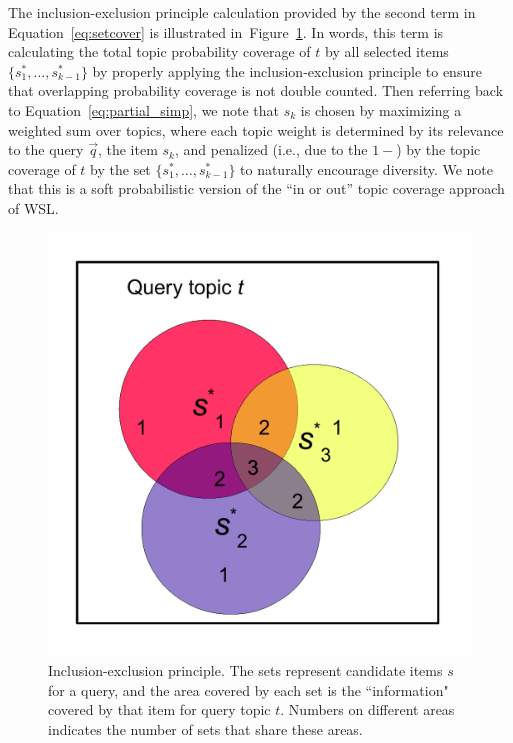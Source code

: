 The inclusion-exclusion principle calculation provided by the second term in Equation~\ref{eq:setcover}
is illustrated in~Figure~\ref{fig:inclusionExclusionPrinciple}. In words, this term is calculating the total topic probability coverage of $t$ by all
selected items $\{ s_1^*,\ldots,s_{k-1}^* \}$ by properly applying the
inclusion-exclusion principle to ensure that overlapping probability coverage
is not double counted. Then referring back to Equation~\ref{eq:partial_simp}, we note that $s_k$ is chosen by maximizing a weighted
sum over topics, where each topic weight is determined by its relevance
to the query $\vec{q}$, the item $s_k$, and penalized (i.e., due to the $1 - $)
by the topic coverage of $t$ by the set $\{ s_1^*,\ldots,s_{k-1}^* \}$ to
naturally encourage diversity.  We note that this is a soft probabilistic
version of the ``in or out'' topic coverage approach of WSL.

\begin{figure}[t!]
\begin{center}
\centerline{\includegraphics[scale = 0.4]{inclusionExclusionPrinciple}}
\caption[Inclusion-exclusion principle.]{Inclusion-exclusion principle. The sets represent candidate
items $s$ for a query, and the area covered by each set is the
``information" covered by that item for query topic $t$. Numbers on different areas
indicates the number of sets that share these areas. }
\label{fig:inclusionExclusionPrinciple}
\end{center}
\end{figure}

